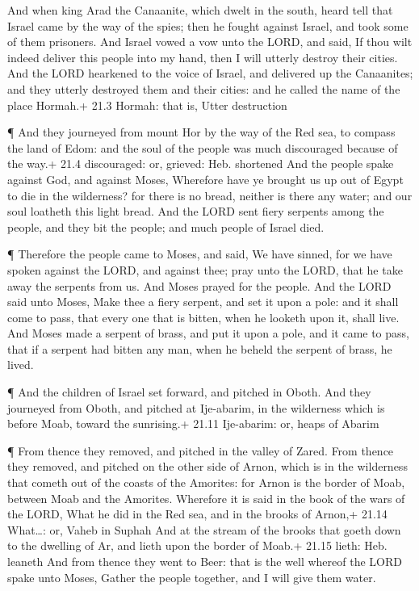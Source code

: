  And when king Arad the Canaanite, which dwelt in the south,
heard tell that Israel came by the way of the spies; then he fought
against Israel, and took some of them prisoners.  And Israel
vowed a vow unto the LORD, and said, If thou wilt indeed deliver this
people into my hand, then I will utterly destroy their cities.
 And the LORD hearkened to the voice of Israel, and
delivered up the Canaanites; and they utterly destroyed them and their
cities: and he called the name of the place Hormah.+ 21.3 Hormah: that
is, Utter destruction

 ¶ And they journeyed from mount Hor by the way of the Red
sea, to compass the land of Edom: and the soul of the people was much
discouraged because of the way.+ 21.4 discouraged: or, grieved: Heb.
shortened  And the people spake against God, and against
Moses, Wherefore have ye brought us up out of Egypt to die in the
wilderness? for there is no bread, neither is there any water; and our
soul loatheth this light bread.  And the LORD sent fiery
serpents among the people, and they bit the people; and much people of
Israel died.

 ¶ Therefore the people came to Moses, and said, We have
sinned, for we have spoken against the LORD, and against thee; pray unto
the LORD, that he take away the serpents from us. And Moses prayed for
the people.  And the LORD said unto Moses, Make thee a fiery
serpent, and set it upon a pole: and it shall come to pass, that every
one that is bitten, when he looketh upon it, shall live. 
And Moses made a serpent of brass, and put it upon a pole, and it came
to pass, that if a serpent had bitten any man, when he beheld the
serpent of brass, he lived.

 ¶ And the children of Israel set forward, and pitched in
Oboth.  And they journeyed from Oboth, and pitched at
Ije-abarim, in the wilderness which is before Moab, toward the
sunrising.+ 21.11 Ije-abarim: or, heaps of Abarim

 ¶ From thence they removed, and pitched in the valley of
Zared.  From thence they removed, and pitched on the other
side of Arnon, which is in the wilderness that cometh out of the coasts
of the Amorites: for Arnon is the border of Moab, between Moab and the
Amorites.  Wherefore it is said in the book of the wars of
the LORD, What he did in the Red sea, and in the brooks of Arnon,+ 21.14
What\ldots: or, Vaheb in Suphah  And at the stream of the
brooks that goeth down to the dwelling of Ar, and lieth upon the border
of Moab.+ 21.15 lieth: Heb. leaneth  And from thence they
went to Beer: that is the well whereof the LORD spake unto Moses, Gather
the people together, and I will give them water.

